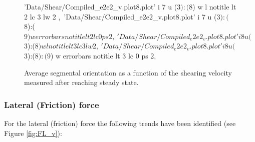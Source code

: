 \documentclass[aps,prb,reprint,superscriptaddress, a4paper]{revtex4-1}
\begin{document}
\begin{figure}
\begin{center}
\begin{gnuplot}[terminal=pdf, terminaloptions={size \SERFigwidth cm, \SERFigheight cm color solid}]
					'Data/Shear/Compiled_e2e2_v.plot8.plot' i 7 u ($3):($8) w l notitle  lt 2 lc 3 lw 2 ,\
					'Data/Shear/Compiled_e2e2_v.plot8.plot' i 7 u ($3):($8):($9) w errorbars notitle  lt 2 lc 0 ps 2,\
					'Data/Shear/Compiled_e2e2_v.plot8.plot' i 8 u ($3):($8) w l notitle  lt 3 lc 3 lw 2 ,\
					'Data/Shear/Compiled_e2e2_v.plot8.plot' i 8 u ($3):($8):($9) w errorbars notitle  lt 3 lc 0 ps 2,\
		\end{gnuplot}
		\caption{Average segmental orientation as a function of the shearing velocity measured after reaching steady state.}
		\label{fig:P2_v}
	\end{center}
 \end{figure}


\subsubsection{Lateral (Friction) force}

For the lateral (friction) force the following trends have been identified (see Figure \ref{fig:FL_v}):
\end{document}

